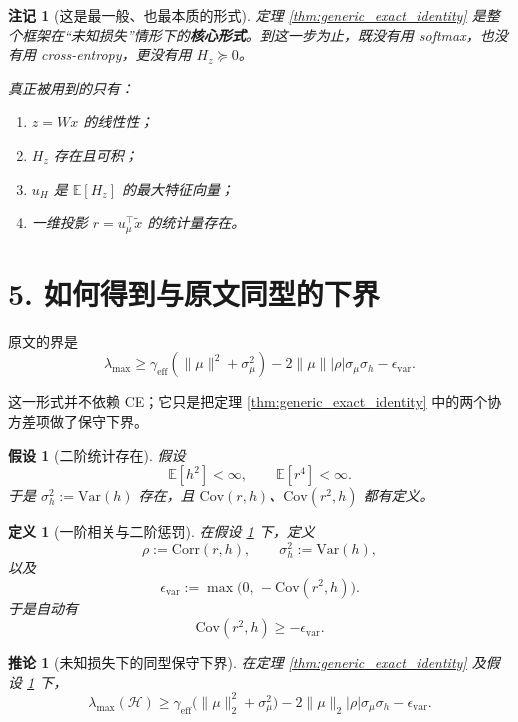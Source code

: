 \documentclass[11pt]{ctexart}
\newtheorem{corollary}{推论}
\newtheorem{definition}{定义}
\newtheorem{remark}{注记}
\newtheorem{assumption}{假设}
\begin{document}
\begin{remark}[这是最一般、也最本质的形式]
定理 \ref{thm:generic_exact_identity} 是整个框架在“未知损失”情形下的\textbf{核心形式}。到这一步为止，既没有用 softmax，也没有用 cross-entropy，更没有用 $H_z \succeq 0$。

真正被用到的只有：
\begin{enumerate}[label=(\alph*)]
    \item $z = Wx$ 的线性性；
    \item $H_z$ 存在且可积；
    \item $u_H$ 是 $\mathbb{E}[H_z]$ 的最大特征向量；
    \item 一维投影 $r = u_\mu^\top \tilde{x}$ 的统计量存在。
\end{enumerate}
\end{remark}

\section*{5. 如何得到与原文同型的下界}

原文的界是
\[
\lambda_{\max} \ge \gamma_{\mathrm{eff}}(\|\mu\|^2 + \sigma_\mu^2)
- 2\|\mu\||\rho|\sigma_\mu \sigma_h
- \epsilon_{\mathrm{var}}.
\]

这一形式并不依赖 CE；它只是把定理 \ref{thm:generic_exact_identity} 中的两个协方差项做了保守下界。

\begin{assumption}[二阶统计存在]\label{ass:moment_finite}
假设
\[
\mathbb{E}[h^2] < \infty, \qquad \mathbb{E}[r^4] < \infty.
\]
于是 $\sigma_h^2 := \mathrm{Var}(h)$ 存在，且 $\mathrm{Cov}(r,h)$、$\mathrm{Cov}(r^2,h)$ 都有定义。
\end{assumption}

\begin{definition}[一阶相关与二阶惩罚]
在假设 \ref{ass:moment_finite} 下，定义
\[
\rho := \mathrm{Corr}(r,h),
\qquad
\sigma_h^2 := \mathrm{Var}(h),
\]
以及
\[
\epsilon_{\mathrm{var}} := \max\bigl(0,\,-\mathrm{Cov}(r^2,h)\bigr).
\]
于是自动有
\[
\mathrm{Cov}(r^2,h) \ge -\epsilon_{\mathrm{var}}.
\]
\end{definition}

\begin{corollary}[未知损失下的同型保守下界]\label{cor:generic_bound}
在定理 \ref{thm:generic_exact_identity} 及假设 \ref{ass:moment_finite} 下，
\begin{equation}\label{eq:generic_bound}
\lambda_{\max}(\mathcal{H})
\ge
\gamma_{\mathrm{eff}}\big(\|\mu\|_2^2 + \sigma_\mu^2\big)
- 2\|\mu\|_2 |\rho| \sigma_\mu \sigma_h
- \epsilon_{\mathrm{var}}.
\end{equation}
\end{corollary}
\end{document}
